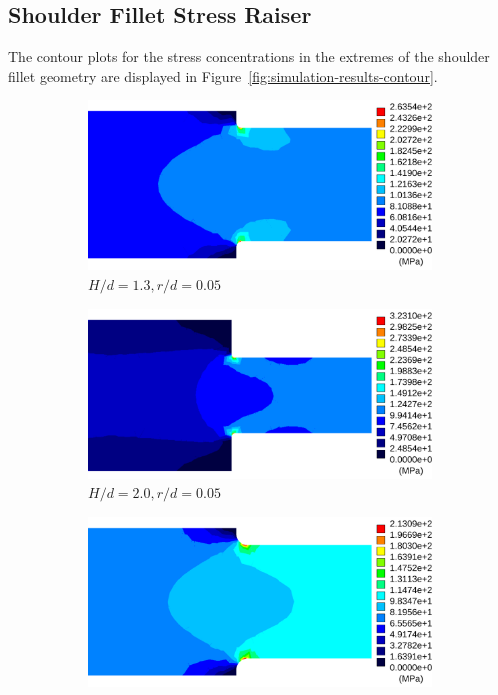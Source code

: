 \documentclass[a4paper,11pt,twocolumn]{article}
\begin{document}
\subsection{Shoulder Fillet Stress Raiser}

The contour plots for the stress concentrations in the extremes of the shoulder
fillet geometry are displayed in Figure~\vref{fig:simulation-results-contour}.

\begin{figure}[t]
    \centering
    \begin{subfigure}[b]{0.48\textwidth}
        \includegraphics[width=\textwidth]{img/Hd1-3_rd0-05.pdf}
        \caption{$H/d = 1.3,r/d = 0.05$}
    \end{subfigure}
    \begin{subfigure}[b]{0.48\textwidth}
        \includegraphics[width=\textwidth]{img/Hd2-0_rd0-05.pdf}
        \caption{$H/d = 2.0,r/d = 0.05$}
    \end{subfigure}
    \begin{subfigure}[b]{0.48\textwidth}
        \includegraphics[width=\textwidth]{img/Hd1-3_rd0-10.pdf}

\end{subfigure}
\end{figure}
\end{document}
